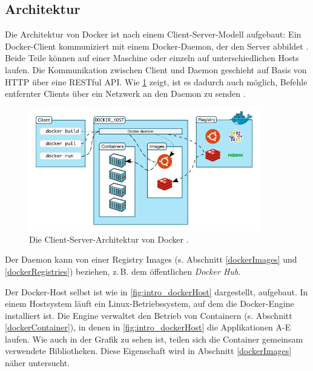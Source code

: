 \documentclass[../main.tex]{subfiles}
\begin{document}
		\subsection{Architektur}
		\label{dockerArchitecture}
      Die Architektur von Docker ist nach einem Client-Server-Modell aufgebaut: Ein Docker-Client kommuniziert mit einem Docker-Daemon, der den Server abbildet \cite{dockerUnderstandingDocker}. Beide Teile können auf einer Maschine oder einzeln auf unterschiedlichen Hosts laufen. Die Kommunikation zwischen Client und Daemon geschieht auf Basis von \acrshort{HTTP} über eine \acrshort{REST}ful \acrshort{API}. Wie \fig \ref{fig:intro_dockerArchitecture} zeigt, ist es dadurch auch möglich, Befehle entfernter Clients über ein Netzwerk an den Daemon zu senden \cite[S.3]{dockerSecIntro}.

      \begin{figure}[h]
          \centering
          \includegraphics[width=0.9\textwidth]{./images/intro_dockerArchitecture.jpg}
          \caption{Die Client-Server-Architektur von Docker \cite{dockerUnderstandingDocker}.}
          \label{fig:intro_dockerArchitecture}
      \end{figure}

      Der Daemon kann von einer Registry Images (s. Abschnitt \ref{dockerImages} und \ref{dockerRegistries}) beziehen, z.\,B. dem öffentlichen \emph{Docker Hub}.

      Der Docker-Host selbst ist wie in \fig \ref{fig:intro_dockerHost} dargestellt, aufgebaut. In einem Hostsystem läuft ein Linux-Betriebssystem, auf dem die Docker-Engine installiert ist. Die Engine verwaltet den Betrieb von Containern (s. Abschnitt \ref{dockerContainer}), in denen in \fig \ref{fig:intro_dockerHost} die Applikationen A-E laufen. Wie auch in der Grafik zu sehen ist, teilen sich die Container gemeinsam verwendete Bibliotheken. Diese Eigenschaft wird in Abschnitt \ref{dockerImages} näher untersucht.
\end{document}
